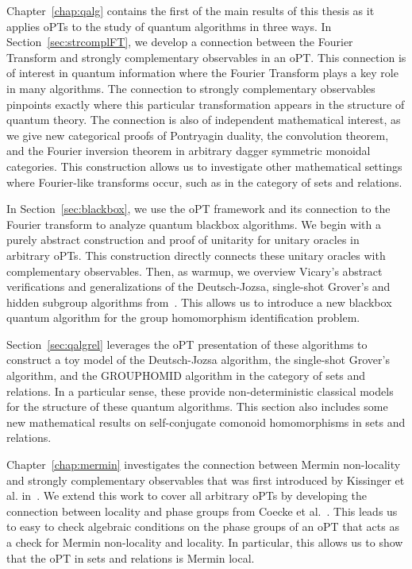 Chapter~\ref{chap:qalg} contains the first of the main results of this thesis as it applies oPTs to the study of quantum algorithms in three ways.  In Section~\ref{sec:strcomplFT}, we develop a connection between the Fourier Transform and strongly complementary observables in an oPT.  This connection is of interest in quantum information where the Fourier Transform plays a key role in many algorithms.  The connection to strongly complementary observables pinpoints exactly where this particular transformation appears in the structure of quantum theory.  The connection is also of independent mathematical interest, as we give new categorical proofs of Pontryagin duality, the convolution theorem, and the Fourier inversion theorem in arbitrary dagger symmetric monoidal categories. This construction allows us to investigate other mathematical settings where Fourier-like transforms occur, such as in the category of sets and relations.

In Section~\ref{sec:blackbox}, we use the oPT framework and its connection to the Fourier transform to analyze quantum blackbox algorithms.  We begin with a purely abstract construction and proof of unitarity for unitary oracles in arbitrary oPTs. This construction directly connects these unitary oracles with complementary observables. Then, as warmup, we overview Vicary's abstract verifications and generalizations  of the Deutsch-Jozsa, single-shot Grover's and hidden subgroup algorithms from~\cite{vicary-tqa}.  This allows us to introduce a new blackbox quantum algorithm for the group homomorphism identification problem.

Section~\ref{sec:qalgrel} leverages the oPT presentation of these algorithms to construct a toy model of the Deutsch-Jozsa algorithm, the single-shot Grover's algorithm, and the GROUPHOMID algorithm in the category of sets and relations. In a particular sense, these provide non-deterministic classical models for the structure of these quantum algorithms. This section also includes some new mathematical results on self-conjugate comonoid homomorphisms in sets and relations.

Chapter~\ref{chap:mermin} investigates the connection between Mermin non-locality and strongly complementary observables that was first introduced by Kissinger et al. in~\cite{coecke2012strong}. We extend this work to cover all arbitrary oPTs by developing the connection between locality and phase groups from Coecke et al.~\cite{coecke2011phase}. This leads us to easy to check algebraic conditions on the phase groups of an oPT that acts as a check for Mermin non-locality and locality. In particular, this allows us to show that the oPT in sets and relations is Mermin local.

